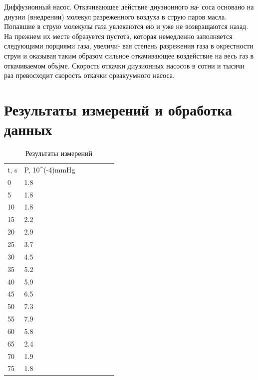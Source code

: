 \documentclass[a4paper,12pt]{article} %
\begin{document}
Диффузионный насос. Откачивающее действие диузионного на-
соса основано на диузии (внедрении) молекул разреженного воздуха
в струю паров масла. Попавшие в струю молекулы газа увлекаются ею
и уже не возвращаются назад. На прежнем их месте образуется пустота,
которая немедленно заполняется следующими порциями газа, увеличи-
вая степень разрежения газа в окрестности струи и оказывая таким
образом сильное откачивающее воздействие на весь газ в откачиваемом
объјме. Скорость откачки диузионных насосов в сотни и тысячи раз
превосходит скорость откачки орвакуумного насоса.  \\

\section{Результаты измерений и обработка данных}

\begin{table}[H]
	\caption{Результаты измерений}
	\label{table:main}
\begin{tabular}{lllllll}
t, s & P, 10\textasciicircum{}(-4)mmHg &  &  &  &  &  \\
0    & 1.8                              &  &  &  &  &  \\
5    & 1.8                              &  &  &  &  &  \\
10   & 1.8                              &  &  &  &  &  \\
15   & 2.2                              &  &  &  &  &  \\
20   & 2.9                              &  &  &  &  &  \\
25   & 3.7                              &  &  &  &  &  \\
30   & 4.5                              &  &  &  &  &  \\
35   & 5.2                              &  &  &  &  &  \\
40   & 5.9                              &  &  &  &  &  \\
45   & 6.5                              &  &  &  &  &  \\
50   & 7.3                              &  &  &  &  &  \\
55   & 7.9                              &  &  &  &  &  \\
60   & 5.8                              &  &  &  &  &  \\
65   & 2.4                              &  &  &  &  &  \\
70   & 1.9                              &  &  &  &  &  \\
75   & 1.8                              &  &  &  &  & 
\end{tabular}
\end{table}
\end{document}
